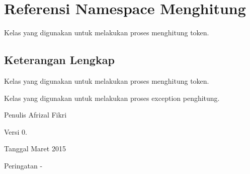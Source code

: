 \hypertarget{namespaceMenghitung}{}\section{Referensi Namespace Menghitung}
\label{namespaceMenghitung}


Kelas yang digunakan untuk melakukan proses menghitung token.  




\subsection{Keterangan Lengkap}
Kelas yang digunakan untuk melakukan proses menghitung token. 

Kelas yang digunakan untuk melakukan proses exception penghitung.

\begin{DoxyAuthor}{Penulis}
Afrizal Fikri 
\end{DoxyAuthor}
\begin{DoxyVersion}{Versi}
0. 
\end{DoxyVersion}
\begin{DoxyDate}{Tanggal}
Maret 2015 
\end{DoxyDate}
\begin{DoxyWarning}{Peringatan}
-\/ 
\end{DoxyWarning}
